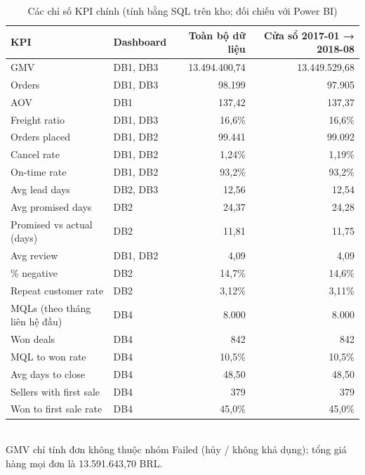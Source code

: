 \begin{table}[htbp]
\centering\small
\caption{Các chỉ số KPI chính (tính bằng SQL trên kho; đối chiếu với Power BI)}
\label{tab:kpi}
\begin{tabular}{llrr}
\toprule
\textbf{KPI} & \textbf{Dashboard} & \textbf{Toàn bộ dữ liệu} & \textbf{Cửa sổ 2017-01 → 2018-08} \\
\midrule
GMV & DB1, DB3 & 13.494.400,74 & 13.449.529,68 \\
Orders & DB1, DB3 & 98.199 & 97.905 \\
AOV & DB1 & 137,42 & 137,37 \\
Freight ratio & DB1, DB3 & 16,6\% & 16,6\% \\
Orders placed & DB1, DB2 & 99.441 & 99.092 \\
Cancel rate & DB1, DB2 & 1,24\% & 1,19\% \\
On-time rate & DB1, DB2 & 93,2\% & 93,2\% \\
Avg lead days & DB2, DB3 & 12,56 & 12,54 \\
Avg promised days & DB2 & 24,37 & 24,28 \\
Promised vs actual (days) & DB2 & 11,81 & 11,75 \\
Avg review & DB1, DB2 & 4,09 & 4,09 \\
\% negative & DB2 & 14,7\% & 14,6\% \\
Repeat customer rate & DB2 & 3,12\% & 3,11\% \\
MQLs (theo tháng liên hệ đầu) & DB4 & 8.000 & 8.000 \\
Won deals & DB4 & 842 & 842 \\
MQL to won rate & DB4 & 10,5\% & 10,5\% \\
Avg days to close & DB4 & 48,50 & 48,50 \\
Sellers with first sale & DB4 & 379 & 379 \\
Won to first sale rate & DB4 & 45,0\% & 45,0\% \\
\bottomrule
\end{tabular}
\\[2pt]{\footnotesize GMV chỉ tính đơn không thuộc nhóm Failed (hủy / không khả dụng); tổng giá hàng mọi đơn là 13.591.643,70 BRL.}
\end{table}
